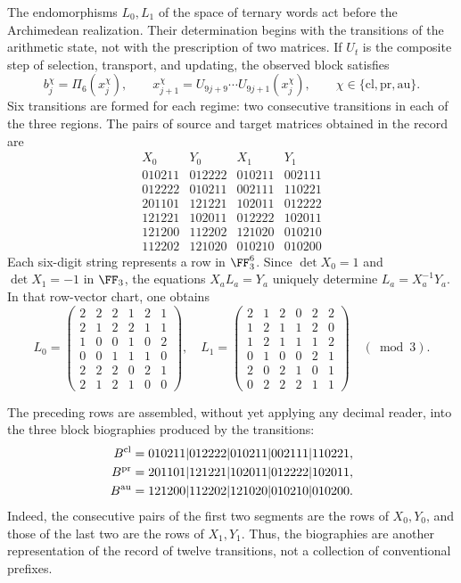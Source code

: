 The endomorphisms \(L_0,L_1\) of the space of ternary words act before the Archimedean realization. Their determination begins with the transitions of the arithmetic state, not with the prescription of two matrices. If \(U_t\) is the composite step of selection, transport, and updating, the observed block satisfies
\[
 b_j^\chi=\Pi_6(x_j^\chi),\qquad
 x_{j+1}^\chi=U_{9j+9}\cdots U_{9j+1}(x_j^\chi),
 \qquad \chi\in\{\mathrm{cl},\mathrm{pr},\mathrm{au}\}.
\]
Six transitions are formed for each regime: two consecutive transitions in each of the three regions. The pairs of source and target matrices obtained in the record are
\[
\begin{array}{c|c|c|c}
X_0&Y_0&X_1&Y_1\\\hline
010211&012222&010211&002111\\
012222&010211&002111&110221\\
201101&121221&102011&012222\\
121221&102011&012222&102011\\
121200&112202&121020&010210\\
112202&121020&010210&010200
\end{array}
\]
Each six-digit string represents a row in \(\FF_3^6\). Since \(\det X_0=1\) and \(\det X_1=-1\) in \(\FF_3\), the equations \(X_aL_a=Y_a\) uniquely determine \(L_a=X_a^{-1}Y_a\). In that row-vector chart, one obtains
\[
 L_0=\begin{pmatrix}
 2&2&2&1&2&1\\2&1&2&2&1&1\\1&0&0&1&0&2\\
 0&0&1&1&1&0\\2&2&2&0&2&1\\2&1&2&1&0&0
 \end{pmatrix},\quad
 L_1=\begin{pmatrix}
 2&1&2&0&2&2\\1&2&1&1&2&0\\1&2&1&1&1&2\\
 0&1&0&0&2&1\\2&0&2&1&0&1\\0&2&2&2&1&1
 \end{pmatrix}\quad(\bmod3).
\]

The preceding rows are assembled, without yet applying any decimal reader,
into the three block biographies produced by the transitions:
\begin{align}
 B^{\rm cl}
  &=010211|012222|010211|002111|110221,\notag\\
 B^{\rm pr}
  &=201101|121221|102011|012222|102011,
 \label{eq:biografias-tpk-tres-caracteres}\\
 B^{\rm au}
  &=121200|112202|121020|010210|010200.\notag
\end{align}
Indeed, the consecutive pairs of the first two segments are the rows
of \(X_0,Y_0\), and those of the last two are the rows of \(X_1,Y_1\).
Thus, the biographies are another representation of the record of twelve
transitions, not a collection of conventional prefixes.

